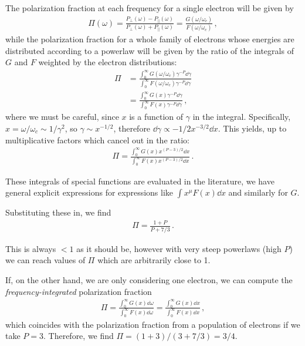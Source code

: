 \documentclass[main.tex]{subfiles}
\begin{document}
The polarization fraction at each frequency for a single electron will be given by 
%
\begin{align}
\Pi (\omega ) 
= \frac{P_\perp (\omega ) - P_\parallel (\omega )}{P_\perp (\omega ) + P_\parallel (\omega )}
= \frac{G( \omega / \omega _c) }{F(\omega / \omega _c)}
\,,
\end{align}
%
while the polarization fraction for a whole family of electrons whose energies are distributed according to a powerlaw will be given by the ratio of the integrals of \(G\) and \(F\) weighted by the electron distributions:  
%
\begin{align}
\Pi &= \frac{\int_0^{\infty } G (\omega / \omega _c) \gamma^{-P} \dd{\gamma }}{\int_0^{\infty } F(\omega  / \omega _c) \gamma^{-P} \dd{\gamma }}  \\
&= \frac{\int_0^{\infty } G (x) \gamma^{-P} \dd{\gamma }}{\int_0^{\infty } F(x) \gamma^{-P} \dd{\gamma }}
\,,
\end{align}
%
where we must be careful, since \(x\) is a function of \(\gamma \) in the integral. Specifically, \(x = \omega / \omega _c \sim 1/ \gamma^2\), so \(\gamma \sim x^{-1/2}\), therefore \(\dd{\gamma } \propto -1/2 x^{-3/2} \dd{x}\). This yields, up to multiplicative factors which cancel out in the ratio: 
%
\begin{align}
\Pi = \frac{\int_0^{\infty } G(x) x^{(P-3) / 2} \dd{x}}{\int_0^{\infty } F(x) x^{(P-3) / 2} \dd{x}}
\,.
\end{align}

These integrals of special functions are evaluated in the literature, we have general explicit expressions for expressions like \(\int x^{\mu } F(x) \dd{x}\) and similarly for \(G\).

Substituting these in, we find 
%
\begin{align}
\Pi = \frac{1 + P}{P + 7/3}
\,.
\end{align}

This is always \(<1\) as it should be, however with very steep powerlaws (high \(P\)) we can reach values of \(\Pi \) which are arbitrarily close to 1.

If, on the other hand, we are only considering one electron, we can compute the \emph{frequency-integrated} polarization fraction 
%
\begin{align}
\Pi 
= \frac{\int_0^{\infty } G(x) \dd{\omega }}{\int_0^{\infty } F(x) \dd{\omega }}
= \frac{\int_0^{\infty } G(x) \dd{x}}{\int_0^{\infty } F(x) \dd{x }}
\,,
\end{align}
%
which coincides with the polarization fraction from a population of electrons if we take \(P = 3\). Therefore, we find \(\Pi = (1+3) / (3 + 7/3) = 3/4\). 
\end{document}
